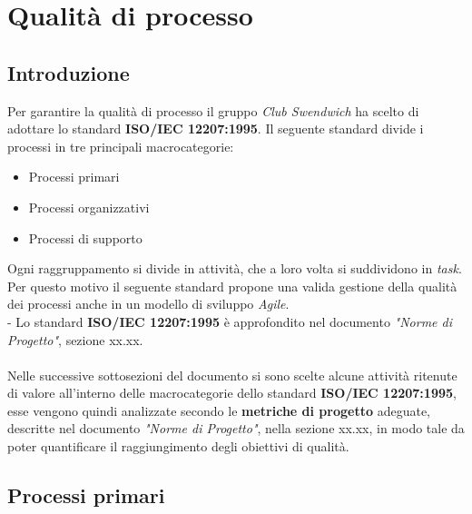 \section{Qualità di processo}
\subsection{Introduzione}
Per garantire la qualità di processo il gruppo \textit{Club Swendwich} 
ha scelto di adottare lo standard \textbf{ISO/IEC 12207:1995}.
Il seguente standard divide i processi in tre principali macrocategorie:
\begin{itemize}
    \item Processi primari
    \item Processi organizzativi
    \item Processi di supporto
\end{itemize}
Ogni raggruppamento si divide in attività, che a loro volta si suddividono
in \textit{task}.\\
Per questo motivo il seguente standard propone una valida gestione della
qualità dei processi anche in un modello di sviluppo \textit{Agile}.\\
\noindent
- Lo standard \textbf{ISO/IEC 12207:1995} è approfondito nel documento \textit{"Norme di Progetto"},
sezione xx.xx. \\
\\
\noindent
Nelle successive sottosezioni del documento si sono scelte alcune attività ritenute di valore all'interno
delle macrocategorie dello standard \textbf{ISO/IEC 12207:1995}, esse vengono quindi analizzate
secondo le \textbf{metriche di progetto} adeguate, descritte nel documento \textit{"Norme di Progetto"},
nella sezione xx.xx, in modo tale da poter quantificare il raggiungimento degli obiettivi
di qualità.

\newpage

\subsection{Processi primari}

